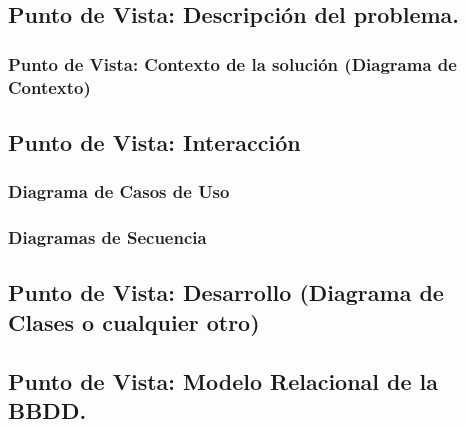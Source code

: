 \subsection{Punto de Vista: Descripción del problema.}
\subsubsection{Punto de Vista: Contexto de la solución (Diagrama de Contexto)}
\subsection{Punto de Vista: Interacción}
\subsubsection{Diagrama de Casos de Uso}
\subsubsection{Diagramas de Secuencia}
\subsection{Punto de Vista: Desarrollo (Diagrama de Clases o cualquier otro)}
\subsection{Punto de Vista: Modelo Relacional de la BBDD.}
